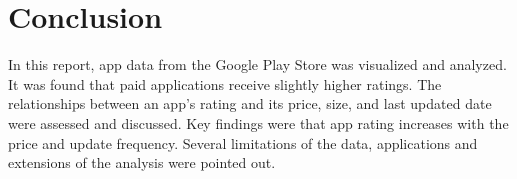 \documentclass{article}
\begin{document}
\section{Conclusion}

In this report, app data from the Google Play Store was visualized and analyzed. It was found that paid applications receive slightly higher ratings. The relationships between an app's rating and its price, size, and last updated date were assessed and discussed. Key findings were that app rating increases with the price and update frequency. Several limitations of the data, applications and extensions of the analysis were pointed out.

\appendix
\printbibliography
\end{document}

